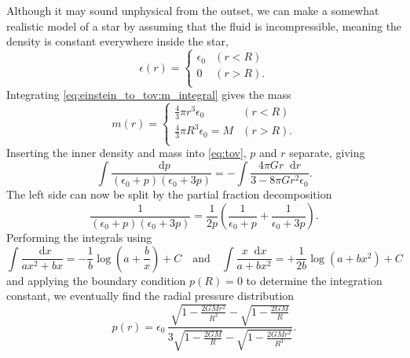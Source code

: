 \documentclass[a4paper,11pt,twoside]{report}
\newcommand\dif{\mathop{}\!\mathrm{d}}
\begin{document}
Although it may sound unphysical from the outset, we can make a somewhat realistic model of a star by assuming that the fluid is incompressible, meaning the density is constant everywhere inside the star,
\begin{equation}
	\epsilon(r) = 
	\begin{cases} 
		\epsilon_0 & (r < R)   \\
		0          & (r > R) . \\
	\end{cases}
\end{equation}
Integrating \cref{eq:einstein_to_tov:m_integral} gives the mass
\begin{equation}
	m(r) = 
	\begin{cases}
		\frac{4}{3} \pi r^3 \epsilon_0     & (r < R)   \\
		\frac{4}{3} \pi R^3 \epsilon_0 = M & (r > R) . \\
	\end{cases}
\end{equation}
Inserting the inner density and mass into \cref{eq:tov}, $p$ and $r$ separate, giving
\begin{equation*}
	\int \frac{\dif p}{(\epsilon_0+p)(\epsilon_0+3p)} = - \int \frac{4 \pi G r \dif r}{3-8\pi G r^2 \epsilon_0} .
\end{equation*}
The left side can now be split by the partial fraction decomposition
\begin{equation*}
	\frac{1}{(\epsilon_0+p)(\epsilon_0+3p)} = \frac{1}{2p} \left( \frac{1}{\epsilon_0+p} + \frac{1}{\epsilon_0+3p} \right) .
\end{equation*}
Performing the integrals using
\begin{equation*}
	\int \frac{\dif x}{a x^2 + b x} = -\frac{1}{b} \log \left( a + \frac{b}{x} \right) + C
	\quad \text{and} \quad
	\int \frac{x \dif x}{a + b x^2} = +\frac{1}{2 b} \log \left( a + b x^2 \right) + C
\end{equation*}
and applying the boundary condition $p(R) = 0$ to determine the integration constant, we eventually find the radial pressure distribution
\begin{equation}
	p(r) = \epsilon_0 \, \frac{\sqrt{1-\frac{2GMr^2}{R^3}} - \sqrt{1-\frac{2GM}{R}}}{3 \sqrt{1-\frac{2GM}{R}} - \sqrt{1-\frac{2GMr^2}{R^3}}} .
\end{equation}
\end{document}

